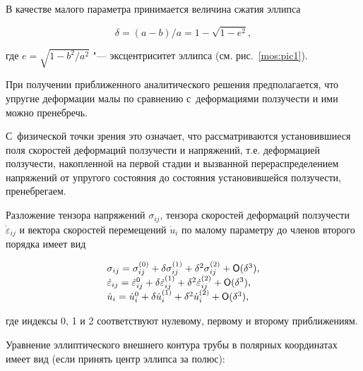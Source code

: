 В качестве малого параметра принимается величина сжатия эллипса

 \begin{equation}

 \label{mos:eq1}

 \delta=(a-b)/a=1-\sqrt{1-e^2},

  \end{equation}

где $e=\sqrt{1-b^2/a^2}$ "--- эксцентриситет эллипса (см. рис.~\ref{mos:pic1}).  

При получении приближенного аналитического решения предполагается, что упругие деформации малы по сравнению с~деформациями ползучести и ими можно пренебречь. 

С~физической точки зрения это означает, что рассматриваются установившиеся поля скоростей деформаций ползучести и напряжений, т.е. деформацией ползучести, накопленной на первой стадии и вызванной перераспределением напряжений от упругого состояния до состояния установившейся ползучести, пренебрегаем.



Разложение тензора напряжений $\sigma_{ij}$, тензора скоростей деформаций ползучести $\dot{\varepsilon}_{ij}$ и вектора скоростей  перемещений $\dot{u}_{i}$ по малому параметру до членов второго порядка имеет вид

\begin{equation*}

\begin{array}{l}

\sigma_{ij}=\sigma^{(0)}_{ij}+\delta \sigma^{(1)}_{ij} + \delta^2 \sigma^{(2)}_{ij}+{\sf O}(\delta^3) ,

\\

\dot{\varepsilon}_{ij}=\dot{\varepsilon}^{0}_{ij}+\delta \dot{\varepsilon}_{ij}^{(1)} + \delta^2 \dot{\varepsilon}_{ij}^{(2)}+{\sf O}(\delta^3) ,

\\

\dot{u}_{i}=\dot{u}^{0}_{i}+\delta \dot{u}_{i}^{(1)} + \delta^2 \dot{u}_{i}^{(2)}+{\sf O}(\delta^3) ,

\end{array}

\end{equation*}

где индексы 0, 1 и 2 соответствуют нулевому, первому и второму приближениям.



Уравнение эллиптического внешнего контура трубы в полярных координатах имеет вид (если принять центр эллипса за полюс):

